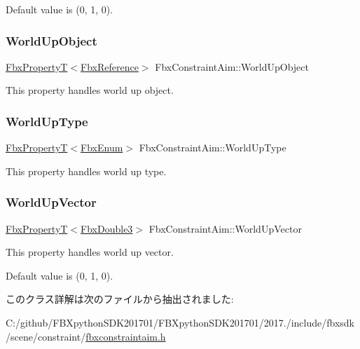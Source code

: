 Default value is (0, 1, 0). \mbox{\label{class_fbx_constraint_aim_a9e0b0e5bff9ccd9e0774f2f59d484b7b}} 
\subsubsection{\texorpdfstring{World\+Up\+Object}{WorldUpObject}}
{\footnotesize\ttfamily \hyperlink{class_fbx_property_t}{Fbx\+PropertyT}$<$\hyperlink{fbxtypes_8h_a44df6a2eec915cf27cd481e5c5e48a24}{Fbx\+Reference}$>$ Fbx\+Constraint\+Aim\+::\+World\+Up\+Object}

This property handles world up object. \mbox{\label{class_fbx_constraint_aim_a01c3d71386a124da25186e795dd29956}} 
\subsubsection{\texorpdfstring{World\+Up\+Type}{WorldUpType}}
{\footnotesize\ttfamily \hyperlink{class_fbx_property_t}{Fbx\+PropertyT}$<$\hyperlink{fbxtypes_8h_a9a28614cb4272a0ad7d748eda7f3d3e5}{Fbx\+Enum}$>$ Fbx\+Constraint\+Aim\+::\+World\+Up\+Type}

This property handles world up type. \mbox{\label{class_fbx_constraint_aim_ae1d68f2cf7730299bbf63c55b52cb540}} 
\subsubsection{\texorpdfstring{World\+Up\+Vector}{WorldUpVector}}
{\footnotesize\ttfamily \hyperlink{class_fbx_property_t}{Fbx\+PropertyT}$<$\hyperlink{fbxtypes_8h_ae0a96f14cde566774c7553aa7523b7a7}{Fbx\+Double3}$>$ Fbx\+Constraint\+Aim\+::\+World\+Up\+Vector}

This property handles world up vector.

Default value is (0, 1, 0). 

このクラス詳解は次のファイルから抽出されました\+:\begin{DoxyCompactItemize}
\item 
C\+:/github/\+F\+B\+Xpython\+S\+D\+K201701/\+F\+B\+Xpython\+S\+D\+K201701/2017./include/fbxsdk/scene/constraint/\hyperlink{fbxconstraintaim_8h}{fbxconstraintaim.\+h}\end{DoxyCompactItemize}
